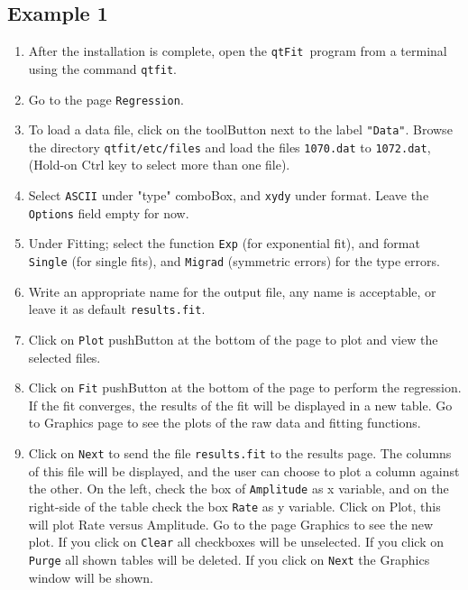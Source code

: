 \documentclass[10pt,letterpaper,oneside]{article}
\newcommand{\name}{\texttt{qtFit}}
\begin{document}
\subsection{Example 1}
\begin{enumerate}
\item After the installation is complete, open the \name\ program from a terminal using the command 
\verb+qtfit+.
\item Go to the page \verb+Regression+.
\item To load a data file, click on the toolButton next to the label \verb+"Data"+. 
Browse the directory \verb+qtfit/etc/files+ and load the files \verb+1070.dat+ to  \verb+1072.dat+,
(Hold-on Ctrl key to select more than one file). 
\item Select \verb+ASCII+ under "type" comboBox, and \verb+xydy+ under format.
Leave the \verb+Options+ field empty for now.
\item Under Fitting; select the function \verb+Exp+ (for exponential fit), and format \verb+Single+
(for single fits), and \verb+Migrad+ (symmetric errors) for the type errors.
\item Write an appropriate name for the output file, any name is acceptable, 
or leave it as default \verb+results.fit+.
\item Click on  \verb+Plot+ pushButton at the bottom of the page to plot and view the selected files.
\item Click on \verb+Fit+ pushButton at the bottom of the page to perform the regression. If the fit 
converges, the results of the fit will be displayed in a new table. Go to Graphics page to see the plots of
the raw data and fitting functions.
\item Click on \verb+Next+ to send the file  \verb+results.fit+ to the results page. The columns of this
file will be displayed, and the user can choose to plot a column against the other. On the left, check the box of 
\verb+Amplitude+ as x variable, and on the right-side of the table 
check the box \verb+Rate+ as y variable. Click on Plot, this will plot Rate versus Amplitude.
Go to the page Graphics to see the new plot.
If you click on \verb+Clear+ all checkboxes will be unselected. 
If you click on \verb+Purge+ all shown tables will be deleted.  
If you click on \verb+Next+ the Graphics window will be shown. 
\end{enumerate}
\end{document}
